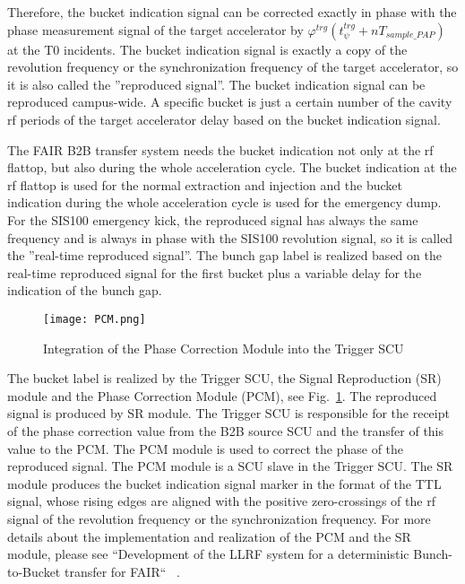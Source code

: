 Therefore, the bucket indication signal can be corrected exactly in phase with the phase measurement signal of the target accelerator by $ \varphi^\mathit{trg}(t_\mathit{\psi}^\mathit{trg}+nT_\mathit{sample\_PAP})$ at the T0 incidents. The bucket indication signal is exactly a copy of the revolution frequency or the synchronization frequency of the target accelerator, so
it is also called the ”reproduced signal”. The bucket indication signal can be reproduced campus-wide. A specific bucket is just a certain number of the cavity rf periods of the target accelerator delay based on the bucket indication signal.






The FAIR B2B transfer system needs the bucket indication not only at the rf flattop, but also during the whole acceleration cycle. The bucket indication at the rf flattop is used for the normal extraction and injection and the bucket indication during the whole acceleration cycle is used for the emergency dump. For the SIS100 emergency kick, the reproduced signal has always the same frequency and is always in phase with the SIS100 revolution signal, so it is called the ''real-time reproduced signal''. The bunch gap label is realized based on the real-time reproduced signal for the first bucket plus a variable delay for the indication of the bunch gap.


 \begin{figure}[!htb]
   \centering   
   \texttt{[image: PCM.png]}
   \caption{Integration of the Phase Correction Module into the Trigger SCU}
   \label{PCM}
\end{figure}
The bucket label is realized by the Trigger SCU, the Signal Reproduction (SR) module and the Phase Correction Module (PCM), see Fig.~\ref{PCM}. The reproduced signal is produced by SR module. The Trigger SCU is responsible for the receipt of the phase correction value from the B2B source SCU and the transfer of this value to the PCM. The PCM module is used to correct the phase of the reproduced signal. The PCM module is a SCU slave in the Trigger SCU. The SR module produces the bucket indication signal marker in the format of the TTL signal, whose rising edges are aligned with the positive zero-crossings of the rf signal of the revolution frequency or the synchronization frequency. For more details about the implementation and realization of the PCM and the SR module, please see ``Development of the LLRF system for a deterministic Bunch-to-Bucket transfer for FAIR`` ~\cite{ferrand_development_nodate}. 

